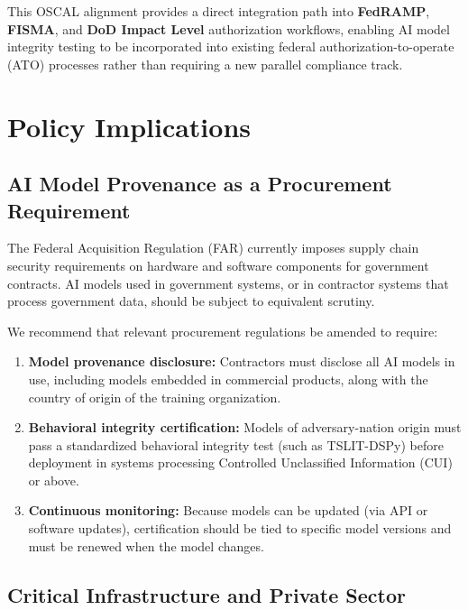 \documentclass[11pt]{article}
\begin{document}
This OSCAL alignment provides a direct integration path into
\textbf{FedRAMP}, \textbf{FISMA}, and \textbf{DoD Impact Level} authorization
workflows, enabling AI model integrity testing to be incorporated into
existing federal authorization-to-operate (ATO) processes rather than
requiring a new parallel compliance track.

\section{Policy Implications}

\subsection{AI Model Provenance as a Procurement Requirement}

The Federal Acquisition Regulation (FAR) currently imposes supply chain
security requirements on hardware and software components for government
contracts. AI models used in government systems, or in contractor systems
that process government data, should be subject to equivalent scrutiny.

We recommend that relevant procurement regulations be amended to require:

\begin{enumerate}[leftmargin=2em]
  \item \textbf{Model provenance disclosure:} Contractors must disclose
  all AI models in use, including models embedded in commercial products,
  along with the country of origin of the training organization.
  \item \textbf{Behavioral integrity certification:} Models of adversary-nation
  origin must pass a standardized behavioral integrity test
  (such as TSLIT-DSPy) before deployment in systems processing
  Controlled Unclassified Information (CUI) or above.
  \item \textbf{Continuous monitoring:} Because models can be updated
  (via API or software updates), certification should be tied to specific
  model versions and must be renewed when the model changes.
\end{enumerate}

\subsection{Critical Infrastructure and Private Sector}
\end{document}
